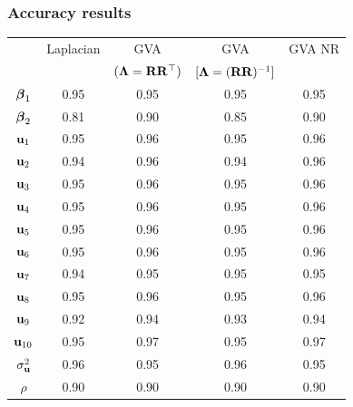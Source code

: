\documentclass{beamer}
\begin{document}
\begin{frame}
	\frametitle{Accuracy results}
	\begin{tabular}{|c|cccc|}
		\hline
		               & Laplacian & GVA                       & GVA                         & GVA NR \\
		               &           & $({\boldsymbol \Lambda}={\bf R} {\bf R}^\top)$ & $[{\boldsymbol \Lambda}=({\bf R} {\bf R})^{-1}]$ &        \\
		\hline
		${\boldsymbol \beta}_1$     & 0.95      & 0.95                      & 0.95                        & 0.95   \\
		${\boldsymbol \beta}_2$     & 0.81      & 0.90                      & 0.85                        & 0.90   \\
		${\bf u}_1$        & 0.95      & 0.96                      & 0.95                        & 0.96   \\
		${\bf u}_2$        & 0.94      & 0.96                      & 0.94                        & 0.96   \\
		${\bf u}_3$        & 0.95      & 0.96                      & 0.95                        & 0.96   \\
		${\bf u}_4$        & 0.95      & 0.96                      & 0.95                        & 0.96   \\
		${\bf u}_5$        & 0.95      & 0.96                      & 0.95                        & 0.96   \\
		${\bf u}_6$        & 0.95      & 0.96                      & 0.95                        & 0.96   \\
		${\bf u}_7$        & 0.94      & 0.95                      & 0.95                        & 0.95   \\
		${\bf u}_8$        & 0.95      & 0.96                      & 0.95                        & 0.96   \\
		${\bf u}_9$        & 0.92      & 0.94                      & 0.93                        & 0.94   \\
		${\bf u}_{10}$     & 0.95      & 0.97                      & 0.95                        & 0.97   \\
		$\sigma_{\bf u}^2$ & 0.96      & 0.95                      & 0.96                        & 0.95   \\
		$\rho$         & 0.90      & 0.90                      & 0.90                        & 0.90   \\
		\hline
	\end{tabular}
\end{frame}
\end{document}
